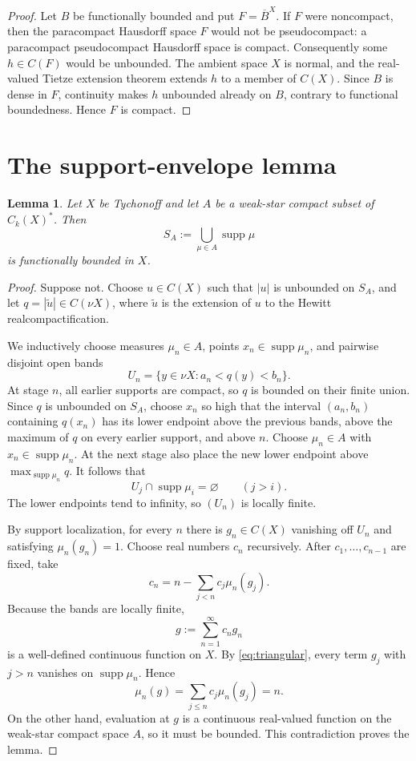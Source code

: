 \documentclass[11pt]{article}
\newtheorem{lemma}[theorem]{Lemma}
\newcommand{\supp}{\operatorname{supp}}
\begin{document}
\begin{proof}
Let $B$ be functionally bounded and put $F=\overline B^X$.  If $F$ were
noncompact, then the paracompact Hausdorff space $F$ would not be
pseudocompact: a paracompact pseudocompact Hausdorff space is compact.
Consequently some $h\in C(F)$ would be unbounded.  The ambient space $X$ is
normal, and the real-valued Tietze extension theorem extends $h$ to a member
of $C(X)$.  Since $B$ is dense in $F$, continuity makes $h$ unbounded already
on $B$, contrary to functional boundedness.  Hence $F$ is compact.
\end{proof}

\clearpage
\section{The support-envelope lemma}

\begin{lemma}\label{lem:support}
Let $X$ be Tychonoff and let $A$ be a weak-star compact subset of $C_k(X)^*$.
Then
\[
 S_A:=\bigcup_{\mu\in A}\supp\mu
\]
is functionally bounded in $X$.
\end{lemma}

\begin{proof}
Suppose not.  Choose $u\in C(X)$ such that $|u|$ is unbounded on $S_A$, and
let $q=|\widetilde u|\in C(\nu X)$, where $\widetilde u$ is the extension of
$u$ to the Hewitt realcompactification.

We inductively choose measures $\mu_n\in A$, points
$x_n\in\supp\mu_n$, and pairwise disjoint open bands
\[
 U_n=\{y\in\nu X:a_n<q(y)<b_n\}.
\]
At stage $n$, all earlier supports are compact, so $q$ is bounded on their
finite union.  Since $q$ is unbounded on $S_A$, choose $x_n$ so high that the
interval $(a_n,b_n)$ containing $q(x_n)$ has its lower endpoint above the
previous bands, above the maximum of $q$ on every earlier support, and above
$n$.  Choose $\mu_n\in A$ with $x_n\in\supp\mu_n$.  At the next stage also
place the new lower endpoint above $\max_{\supp\mu_n}q$.  It follows that
\begin{equation}\label{eq:triangular}
 U_j\cap\supp\mu_i=\varnothing \qquad(j>i).
\end{equation}
The lower endpoints tend to infinity, so $(U_n)$ is locally finite.

By support localization, for every $n$ there is $g_n\in C(X)$ vanishing off
$U_n$ and satisfying $\mu_n(g_n)=1$.  Choose real numbers $c_n$ recursively.
After $c_1,\ldots,c_{n-1}$ are fixed, take
\[
 c_n=n-\sum_{j<n}c_j\mu_n(g_j).
\]
Because the bands are locally finite,
\[
 g:=\sum_{n=1}^{\infty}c_ng_n
\]
is a well-defined continuous function on $X$.  By
\eqref{eq:triangular}, every term $g_j$ with $j>n$ vanishes on
$\supp\mu_n$.  Hence
\[
 \mu_n(g)=\sum_{j\le n}c_j\mu_n(g_j)=n.
\]
On the other hand, evaluation at $g$ is a continuous real-valued function on
the weak-star compact space $A$, so it must be bounded.  This contradiction
proves the lemma.
\end{proof}
\end{document}
